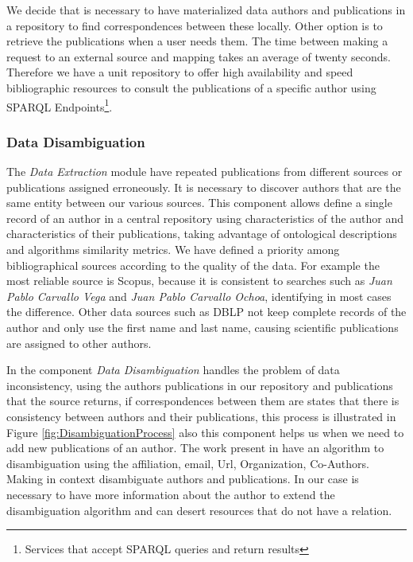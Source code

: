 \documentclass[11pt]{article}
\begin{document}
We decide that is necessary to have materialized data authors and publications in a repository to find correspondences between these locally. Other option is to retrieve the publications when a user needs them. The time between making a request to an external source and mapping takes an average of twenty seconds. Therefore we have a unit repository  to offer high availability and speed bibliographic resources to consult the publications of a specific author using SPARQL Endpoints\footnote{Services that accept SPARQL queries and return results}.

\subsubsection{Data Disambiguation}

The \emph{Data Extraction} module have repeated publications from different sources or publications assigned erroneously. It is necessary to discover  authors that are the same entity between our various sources. This component allows  define a single record of an author in a central repository using characteristics of the author and characteristics of their publications, taking advantage of ontological descriptions and algorithms similarity metrics. We have defined a priority among bibliographical sources according to the quality of the data. For example the most reliable source is Scopus, 
because it is consistent to searches such as   \textit{Juan Pablo Carvallo Vega} and \textit{Juan Pablo Carvallo Ochoa}, identifying in most cases the difference. Other data sources such as DBLP not keep complete records of the author and only use the first name and last name, causing scientific publications are assigned to other authors.


In the component \emph{Data Disambiguation} handles the problem of data inconsistency, using the authors publications in our repository and publications that the source returns, if correspondences between them are states that there is consistency between authors and their publications, this process is illustrated in Figure \ref{fig:DisambiguationProcess} also this component helps us when we need to add new publications of an author. The work present in \cite{varadharajalu2011author} have an algorithm to disambiguation using the affiliation, email, Url, Organization, Co-Authors. Making in context disambiguate authors and publications. In our case  is necessary to have more information about the author to  extend the disambiguation algorithm and can desert resources that do not have a relation.
\end{document}
